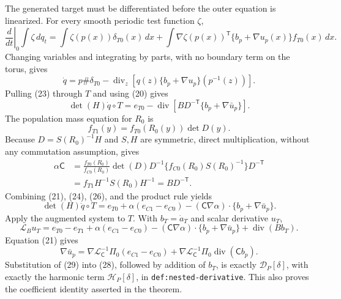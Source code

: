 The generated target must be differentiated before the outer equation is linearized.  For every smooth periodic test function \(\zeta\),
\[
 \left.\frac d{dt}\right|_0\int\zeta\,dq_t
 =\int\zeta(p(x))\delta_{T0}(x)\,dx
 +\int\nabla\zeta(p(x))^{\mathsf T}
       \{b_p+\nabla u_p(x)\}f_{T0}(x)\,dx.                             \tag{22}
\]
Changing variables and integrating by parts, with no boundary term on the torus, gives
\[
 \dot q=p\#\delta_{T0}
 -\operatorname{div}_z\!\left[q(z)
 \{b_p+\nabla u_p\}(p^{-1}(z))\right].                                \tag{23}
\]
Pulling (23) through \(T\) and using (20) gives
\[
 \det(H)\dot q\circ T=e_{T0}
 -\operatorname{div}\!\left[BD^{-\mathsf T}
 \{b_p+\nabla\bar u_p\}\right].                                     \tag{24}
\]
The population mass equation for \(R_0\) is
\[
 f_{T1}(y)=f_{T0}(R_0(y))\det D(y).                                    \tag{25}
\]
Because \(D=S(R_0)^{-1}H\) and \(S,H\) are symmetric, direct multiplication, without any commutation assumption, gives
\[
 \begin{aligned}
 \alpha\mathsf C
 &=\frac{f_{T0}(R_0)}{f_{C0}(R_0)}\det(D)D^{-1}
   \{f_{C0}(R_0)S(R_0)^{-1}\}D^{-\mathsf T}\\
 &=f_{T1}H^{-1}S(R_0)H^{-1}=BD^{-\mathsf T}.                           \tag{26}
 \end{aligned}
\]
Combining (21), (24), (26), and the product rule yields
\[
 \det(H)\dot q\circ T=e_{T0}+\alpha(e_{C1}-e_{C0})
 -(\mathsf C\nabla\alpha)\cdot\{b_p+\nabla\bar u_p\}.              \tag{27}
\]
Apply the augmented system to \(T\).  With \(b_T=\dot a_T\) and scalar derivative \(u_T\),
\[
 \mathcal L_Bu_T=e_{T0}-e_{T1}+\alpha(e_{C1}-e_{C0})
 -(\mathsf C\nabla\alpha)\cdot\{b_p+\nabla\bar u_p\}
 +\operatorname{div}(Bb_T).                                           \tag{28}
\]
Equation (21) gives
\[
 \nabla\bar u_p=
 \nabla\mathcal L_{\mathsf C}^{-1}\Pi_0(e_{C1}-e_{C0})
 +\nabla\mathcal L_{\mathsf C}^{-1}\Pi_0
   \operatorname{div}(\mathsf Cb_p).                                  \tag{29}
\]
Substitution of (29) into (28), followed by addition of \(b_T\), is exactly \(\mathcal D_P[\delta]\), with exactly the harmonic term \(\mathcal H_P[\delta]\), in \texttt{def:nested-derivative}.  This also proves the coefficient identity asserted in the theorem.

